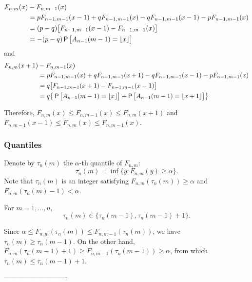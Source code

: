 \documentclass[11pt,draft]{article}
\begin{document}
\begin{align*}
 F_{n,m}(x) &- F_{n,m-1}(x) \\
&= p F_{n-1,m-1}(x-1) + q F_{n-1,m-1}(x) - q F_{n-1,m-1}(x-1)
 - p F_{n-1,m-1}(x) \\
&= (p-q) \big[ F_{n-1,m-1}(x-1) - F_{n-1,m-1}(x) \big] \\
&= -(p-q) \P\big[A_{n-1}(m-1) = \lfloor x \rfloor\big]
\end{align*}
and
\begin{align*}
 F_{n,m}(x+1) &- F_{n,m-1}(x) \\
&= p F_{n-1,m-1}(x) + q F_{n-1,m-1}(x+1) - q F_{n-1,m-1}(x-1)
 - p F_{n-1,m-1}(x) \\
&= q\big[ F_{n-1,m-1}(x+1) - F_{n-1,m-1}(x-1) \big] \\
&= q \big\{ \P\big[A_{n-1}(m-1) = \lfloor x \rfloor\big] +
\P\big[A_{n-1}(m-1) = \lfloor x+1 \rfloor\big] \big\}
\end{align*}

Therefore, $F_{n,m}(x) \leq F_{n,m-1}(x) \leq F_{n,m}(x+1)$ and $F_{n,m-1}(x-1) \leq F_{n,m}(x) \leq F_{n,m-1}(x)$.


\subsubsection{Quantiles}

Denote by $\tau_n(m)$ the $\alpha$-th quantile of $F_{n,m}$:
\[ \tau_n(m) = \inf\{y : F_{n,m}(y) \geq \alpha \}. \]
Note that $\tau_n(m)$ is an integer satisfying $F_{n,m}(\tau_n(m)) \geq \alpha$ and $F_{n,m}(\tau_n(m) - 1) < \alpha$.

\begin{claim}
For $m = 1,\dots,n$,
\[ \tau_n(m) \in \{ \tau_n(m-1), \tau_n(m-1) + 1 \}. \]
\end{claim}
\begin{pf}
Since $\alpha \leq F_{n,m}(\tau_n(m)) \leq F_{n,m-1}(\tau_n(m))$, we have $\tau_n(m) \geq \tau_n(m-1)$.
On the other hand, $F_{n,m}(\tau_n(m-1)+1) \geq F_{n,m-1}(\tau_n(m-1)) \geq \alpha$, from which $\tau_n(m) \leq \tau_n(m-1) + 1$.
\end{pf}

----------------------------
\end{document}
